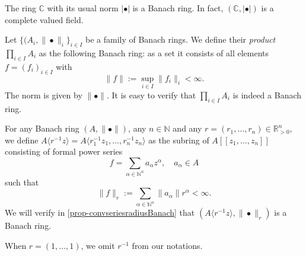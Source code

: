\begin{example}
    The ring $\mathbb{C}$ with its usual norm $|\bullet|$ is a Banach ring. In fact, $(\mathbb{C},|\bullet|)$ is a complete valued field.
\end{example}

\begin{example}\label{ex-Banachringproduct}
    Let $\{(A_i,\|\bullet\|_i\}_{i\in I}$ be a family of Banach rings. We define their \emph{product} $\prod_{i\in I}A_i$ as the following Banach ring: as a set it consists of all elements $f=(f_i)_{i\in I}$ with 
    \[ 
        \|f\|:=\sup_{i\in I}\|f_i\|_i<\infty.
    \]
    The norm is given by $\|\bullet\|$. It is easy to verify that $\prod_{i\in I}A_i$ is indeed a Banach ring.
\end{example}

\begin{example}\label{ex-convseriesradius}
    For any Banach ring $(A,\|\bullet\|)$, any $n\in \mathbb{N}$ and any $r=(r_1,\ldots,r_n)\in \mathbb{R}^n_{>0}$, we define $A\langle r^{-1}z \rangle =A\langle r_1^{-1}z_1,\ldots, r_n^{-1}z_n\rangle$ as the subring of $A[[z_1,\ldots,z_n]]$ consisting of formal power series
    \[
      f=\sum_{\alpha\in \mathbb{N}^{n}} a_{\alpha}z^{\alpha},\quad a_{\alpha}\in A  
    \]
    such that
    \[
        \|f\|_r:=   \sum_{\alpha\in \mathbb{N}^{n}} \|a_{\alpha}\|r^{\alpha}<\infty.
    \]
    We will verify in \cref{prop-convseriesradiusBanach} that $(A\langle r^{-1}z \rangle ,\|\bullet\|_r)$ is a Banach ring.

    When $r=(1,\ldots,1)$, we omit $r^{-1}$ from our notations.
\end{example}

